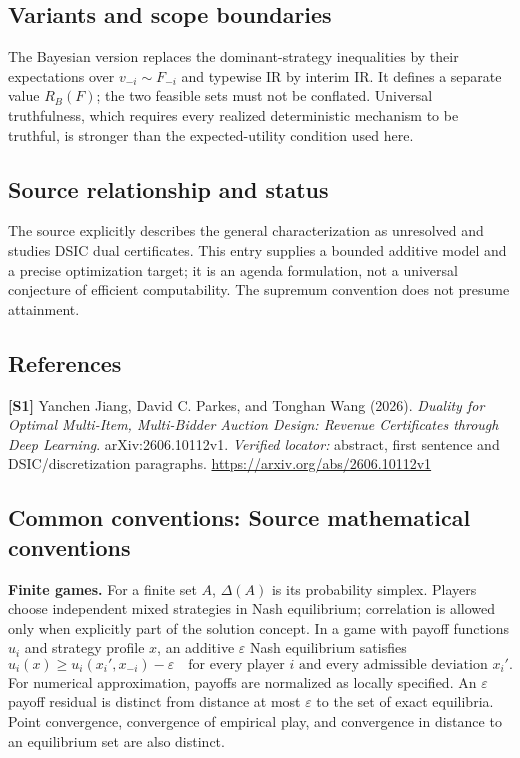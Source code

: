\documentclass[11pt,a4paper]{article}
\begin{document}
\subsection*{Variants and scope boundaries}
The Bayesian version replaces the dominant-strategy inequalities by their expectations over $v_{-i}\sim F_{-i}$ and typewise IR by interim IR. It defines a separate value $R_B(F)$; the two feasible sets must not be conflated. Universal truthfulness, which requires every realized deterministic mechanism to be truthful, is stronger than the expected-utility condition used here.
\subsection*{Source relationship and status}
The source explicitly describes the general characterization as unresolved and studies DSIC dual certificates. This entry supplies a bounded additive model and a precise optimization target; it is an agenda formulation, not a universal conjecture of efficient computability. The supremum convention does not presume attainment.
\subsection*{References}
\begingroup\footnotesize\raggedright
\textbf{[S1]} Yanchen Jiang, David C. Parkes, and Tonghan Wang (2026). \emph{Duality for Optimal Multi-Item, Multi-Bidder Auction Design: Revenue Certificates through Deep Learning}. arXiv:2606.10112v1. \textit{Verified locator:} abstract, first sentence and DSIC/discretization paragraphs. \url{https://arxiv.org/abs/2606.10112v1}
\par\endgroup

\subsection*{Common conventions: Source mathematical conventions}

\textbf{Finite games.} For a finite set $A$, $\Delta(A)$ is its probability
simplex. Players choose independent mixed strategies in Nash equilibrium;
correlation is allowed only when explicitly part of the solution concept.
In a game with payoff functions $u_i$ and strategy profile $x$, an additive
$\varepsilon$ Nash equilibrium satisfies
\[
 u_i(x)\geq u_i(x_i',x_{-i})-\varepsilon
 \quad\text{for every player $i$ and every admissible deviation $x_i'$}.
\]
For numerical approximation, payoffs are normalized as locally specified.
An $\varepsilon$ payoff residual is distinct from distance at most
$\varepsilon$ to the set of exact equilibria. Point convergence, convergence
of empirical play, and convergence in distance to an equilibrium set are
also distinct.
\end{document}
